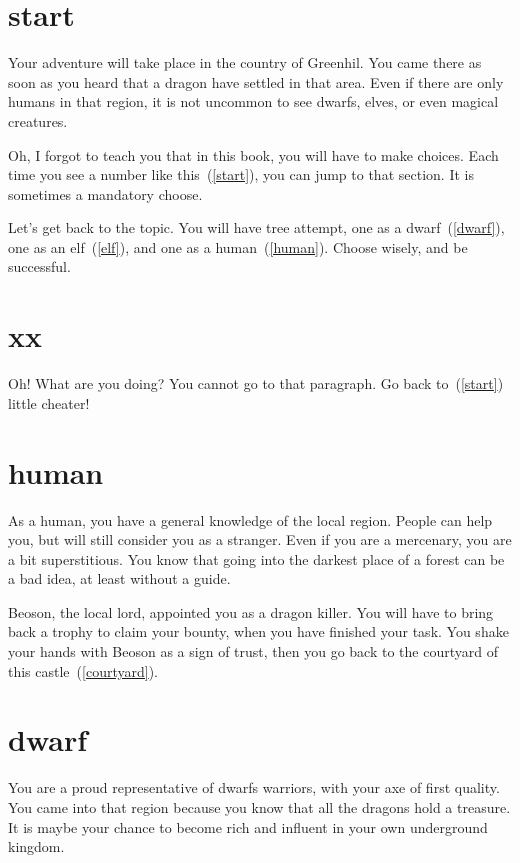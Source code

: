 \section{start}

Your adventure will take place in the country of Greenhil. You came there as soon
as you heard that a dragon have settled in that area. Even if there are only
humans in that region, it is not uncommon to see dwarfs, elves, or even magical
creatures.

Oh, I forgot to teach you that in this book, you will have to make choices. Each
time you see a number like this~(\ref{start}), you can jump to that section.
It is sometimes a mandatory choose.

Let's get back to the topic. You will have tree attempt, one as a
dwarf~(\ref{dwarf}), one as an elf~(\ref{elf}), and one as a
human~(\ref{human}). Choose wisely, and be successful.

\section{xx}

Oh! What are you doing? You cannot go to that paragraph. Go back
to~(\ref{start}) little cheater!

\section{human}

As a human, you have a general knowledge of the local region. People can help
you, but will still consider you as a stranger. Even if you are a mercenary, you
are a bit superstitious. You know that going into the darkest place of a forest
can be a bad idea, at least without a guide.

Beoson, the local lord, appointed you as a dragon killer. You will have to bring
back a trophy to claim your bounty, when you have finished your task. You shake
your hands with Beoson as a sign of trust, then you go back to the courtyard of
this castle~(\ref{courtyard}).

\section{dwarf}

You are a proud representative of dwarfs warriors, with your axe of first
quality. You came into that region because you know that all the dragons hold a
treasure. It is maybe your chance to become rich and influent in your own
underground kingdom.

